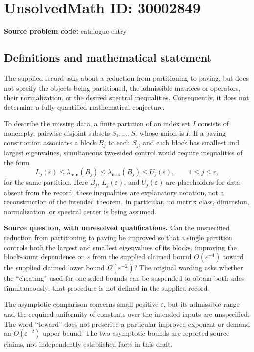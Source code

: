 \documentclass[11pt]{article}
\begin{document}
\section*{UnsolvedMath ID: 30002849}
\textbf{Source problem code:} catalogue entry
\subsection{Definitions and mathematical statement}
The supplied record asks about a reduction from partitioning to paving, but does not specify the objects being partitioned, the admissible matrices or operators, their normalization, or the desired spectral inequalities. Consequently, it does not determine a fully quantified mathematical conjecture.

To describe the missing data, a finite partition of an index set \(I\) consists of nonempty, pairwise disjoint subsets \(S_1,\ldots,S_r\) whose union is \(I\). If a paving construction associates a block \(B_j\) to each \(S_j\), and each block has smallest and largest eigenvalues, simultaneous two-sided control would require inequalities of the form
\[
L_j(\varepsilon)\leq \lambda_{\min}(B_j)
\leq \lambda_{\max}(B_j)\leq U_j(\varepsilon),
\qquad 1\leq j\leq r,
\]
for the same partition. Here \(B_j\), \(L_j(\varepsilon)\), and \(U_j(\varepsilon)\) are placeholders for data absent from the record; these inequalities are explanatory notation, not a reconstruction of the intended theorem. In particular, no matrix class, dimension, normalization, or spectral center is being assumed.

\textbf{Source question, with unresolved qualifications.} Can the unspecified reduction from partitioning to paving be improved so that a single partition controls both the largest and smallest eigenvalues of its blocks, improving the block-count dependence on \(\varepsilon\) from the supplied claimed bound \(O(\varepsilon^{-4})\) toward the supplied claimed lower bound \(\Omega(\varepsilon^{-2})\)? The original wording asks whether the ``cheating'' used for one-sided bounds can be suspended to obtain both sides simultaneously; that procedure is not defined in the supplied record.

The asymptotic comparison concerns small positive \(\varepsilon\), but its admissible range and the required uniformity of constants over the intended inputs are unspecified. The word ``toward'' does not prescribe a particular improved exponent or demand an \(O(\varepsilon^{-2})\) upper bound. The two asymptotic bounds are reported source claims, not independently established facts in this draft.
\end{document}
